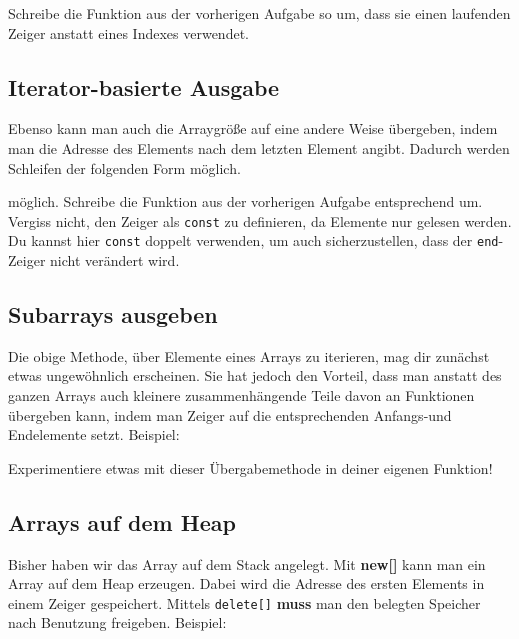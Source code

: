 
Schreibe die Funktion aus der vorherigen Aufgabe so um, dass sie einen laufenden Zeiger anstatt eines Indexes verwendet.

\subsection{Iterator-basierte Ausgabe}
Ebenso kann man auch die Arraygröße auf eine andere Weise übergeben, indem man die Adresse des Elements nach dem letzten Element angibt.
Dadurch werden Schleifen der folgenden Form möglich.


möglich.
Schreibe die Funktion aus der vorherigen Aufgabe entsprechend um.
Vergiss nicht, den Zeiger als \lstinline{const} zu definieren, da Elemente nur gelesen werden.
Du kannst hier \lstinline{const} doppelt verwenden, um auch sicherzustellen, dass der \lstinline{end}-Zeiger nicht verändert wird.

\subsection{Subarrays ausgeben}
Die obige Methode, über Elemente eines Arrays zu iterieren, mag dir zunächst etwas ungewöhnlich erscheinen.
Sie hat jedoch den Vorteil, dass man anstatt des ganzen Arrays auch kleinere zusammenhängende Teile davon an Funktionen übergeben kann, indem man Zeiger auf die entsprechenden Anfangs-und Endelemente setzt.
Beispiel:


Experimentiere etwas mit dieser Übergabemethode in deiner eigenen Funktion!

\subsection{Arrays auf dem Heap}
Bisher haben wir das Array auf dem Stack angelegt.
Mit \textbf{new[]} kann man ein Array auf dem Heap erzeugen.
Dabei wird die Adresse des ersten Elements in einem Zeiger gespeichert.
Mittels \lstinline{delete[]} \textbf{muss} man den belegten Speicher nach Benutzung freigeben.
Beispiel:


